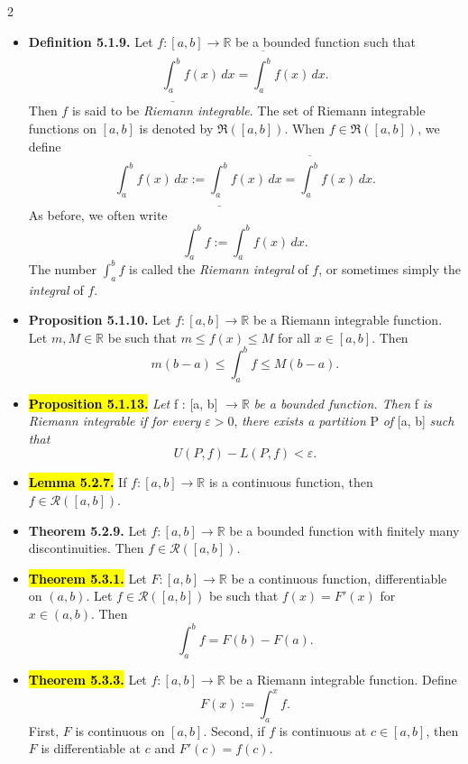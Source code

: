 \documentclass[a4paper,10pt]{article}
\begin{document}
\begin{multicols}{2}
\begin{itemize}
    \item \textbf{Definition 5.1.9.} Let \( f : [a,b] \to \mathbb{R} \) be a bounded function such that
    \[
    \underline{\int_a^b} f(x)\,dx = \overline{\int_a^b} f(x)\,dx.
    \]
    Then \( f \) is said to be \textit{Riemann integrable}. The set of Riemann integrable functions on \( [a,b] \) is denoted by \( \mathfrak{R}([a,b]) \). When \( f \in \mathfrak{R}([a,b]) \), we define
    \[
    \int_a^b f(x)\,dx := \underline{\int_a^b} f(x)\,dx = \overline{\int_a^b} f(x)\,dx.
    \]
    As before, we often write
    \[
    \int_a^b f := \int_a^b f(x)\,dx.
    \]
    The number \( \int_a^b f \) is called the \textit{Riemann integral} of \( f \), or sometimes simply the \textit{integral} of \( f \).

    \item \textbf{Proposition 5.1.10.} Let \( f : [a,b] \to \mathbb{R} \) be a Riemann integrable function. Let \( m, M \in \mathbb{R} \) be such that \( m \leq f(x) \leq M \) for all \( x \in [a,b] \). Then
    \[
    m(b-a) \leq \int_a^b f \leq M(b-a).
    \]

    \item \hl{\textbf{Proposition 5.1.13.}} \textit{Let } f : [a, b] \( \to \mathbb{R} \) \textit{ be a bounded function. Then } f \textit{ is Riemann integrable if for every } \( \varepsilon > 0 \), \textit{ there exists a partition } P \textit{ of } [a, b] \textit{ such that}
    \[
    U(P, f) - L(P, f) < \varepsilon.
    \]

    \item \hl{\textbf{Lemma 5.2.7.}} If \( f : [a,b] \to \mathbb{R} \) is a continuous function, then \( f \in \mathcal{R}([a,b]) \).

    \item \textbf{Theorem 5.2.9.} Let \( f : [a,b] \to \mathbb{R} \) be a bounded function with finitely many discontinuities. Then \( f \in \mathcal{R}([a,b]) \).

    \item \hl{\textbf{Theorem 5.3.1.}} 
    Let \( F : [a, b] \to \mathbb{R} \) be a continuous function, differentiable on \( (a, b) \). 
    Let \( f \in \mathcal{R}([a, b]) \) be such that \( f(x) = F'(x) \) for \( x \in (a, b) \). Then
    \[
    \int_a^b f = F(b) - F(a).
    \]

    \item \hl{\textbf{Theorem 5.3.3.} } 
    Let \( f : [a, b] \to \mathbb{R} \) be a Riemann integrable function. Define  
    \[
    F(x) := \int_a^x f.
    \]  
    First, \( F \) is continuous on \( [a, b] \).  
    Second, if \( f \) is continuous at \( c \in [a, b] \), then \( F \) is differentiable at \( c \) and \( F'(c) = f(c) \).

    








\end{itemize}
\end{multicols}
\end{document}
